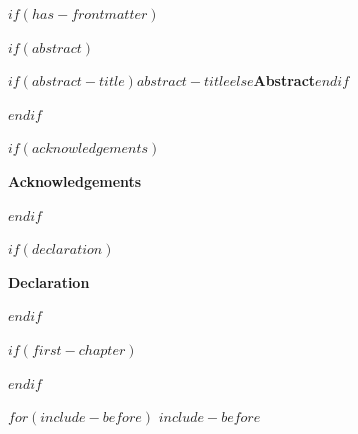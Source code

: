 \documentclass[
$if(fontsize)$
  $fontsize$,
$endif$
$if(papersize)$
  $papersize$paper,
$else$
  paper=a4,
$endif$
$if(beamer)$
  ignorenonframetext,
$if(handout)$
  handout,
$endif$
$if(aspectratio)$
  aspectratio=$aspectratio$,
$endif$
$endif$
$for(classoption)$
  $classoption$$sep$,
$endfor$
  ,captions=tableheading
]{$if(beamer)$$documentclass$$else$$if(book)$scrbook$else$scrartcl$endif$$endif$}
\theoremstyle{plain}
\theoremstyle{definition}
\theoremstyle{remark}
\providecommand{\frontmatter}{}
\begin{document}

$if(has-frontmatter)$
\frontmatter
\frame{\titlepage}
{} %

$if(abstract)$
\begin{center}
 {\LARGE \textbf{\textsf{$if(abstract-title)$$abstract-title$$else$Abstract$endif$}}}
\end{center}

\begin{abstract}
\begin{justify}
  $abstract$
\end{justify}
\end{abstract}
\pagebreak

$endif$


$if(acknowledgements)$
\begin{center}
 {\LARGE \textbf{\textsf{Acknowledgements}}}
\end{center}

\begin{abstract}
\begin{justify}
$acknowledgements$
\end{justify}
\end{abstract}
\pagebreak

$endif$

$if(declaration)$
\begin{center}
 {\LARGE \textbf{\textsf{Declaration}}}
\end{center}

\begin{abstract}
\begin{justify}
  $declaration$ \par
   \vspace{1in}\raggedleft({\em $author$\/})
\end{justify}
\end{abstract}
\pagebreak



$endif$
\setcounter{page}{0} %


$if(first-chapter)$
\setcounter{chapter}{$first-chapter$}
\addtocounter{chapter}{-1}
$endif$

$for(include-before)$
$include-before$
\end{document}
